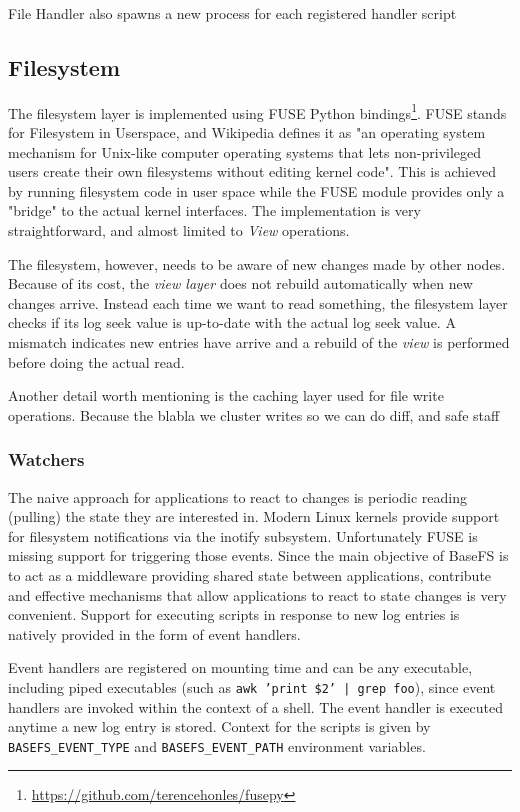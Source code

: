 \documentclass{sig-alternate}
\begin{document}
File Handler also spawns a new process for each registered handler script

\subsection{Filesystem}
The filesystem layer is implemented using FUSE Python bindings\footnote{\url{https://github.com/terencehonles/fusepy}}. FUSE stands for Filesystem in Userspace, and Wikipedia defines it as "an operating system mechanism for Unix-like computer operating systems that lets non-privileged users create their own filesystems without editing kernel code". This is achieved by running filesystem code in user space while the FUSE module provides only a "bridge" to the actual kernel interfaces. The implementation is very straightforward, and almost limited to \textit{View} operations.


The filesystem, however, needs to be aware of new changes made by other nodes. Because of its cost, the \textit{view layer} does not rebuild automatically when new changes arrive. Instead each time we want to read something, the filesystem layer checks if its log seek value is up-to-date with the actual log seek value. A mismatch indicates new entries have arrive and a rebuild of the \textit{view} is performed before doing the actual read.

Another detail worth mentioning is the caching layer used for file write operations. Because the blabla we cluster writes so we can do diff, and safe staff

\subsubsection{Watchers}
The naive approach for applications to react to changes is periodic reading (pulling) the state they are interested in. Modern Linux kernels provide support for filesystem notifications via the inotify subsystem. Unfortunately FUSE is missing support for triggering those events. Since the main objective of BaseFS is to act as a middleware providing shared state between applications, contribute and effective mechanisms that allow applications to react to state changes is very convenient. Support for executing scripts in response to new log entries is natively provided in the form of event handlers.

Event handlers are registered on mounting time and can be any executable, including piped executables (such as \texttt{awk '{print \$2}' | grep foo}), since event handlers are invoked within the context of a shell. The event handler is executed anytime a new log entry is stored. Context for the scripts is given by \texttt{BASEFS\_EVENT\_TYPE} and \texttt{BASEFS\_EVENT\_PATH} environment variables. 
\end{document}
